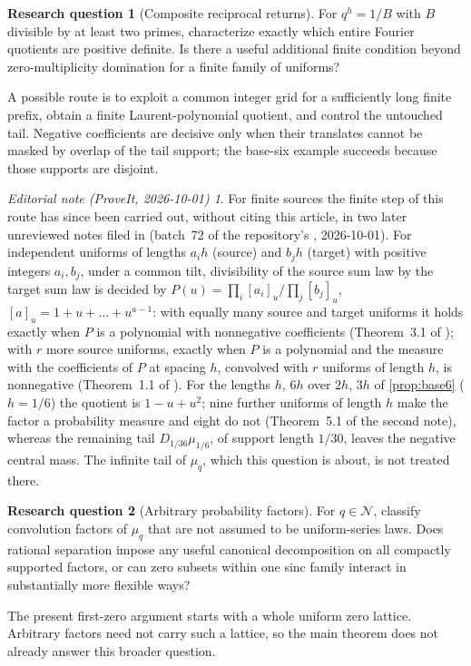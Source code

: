 \documentclass[11pt,letterpaper]{article}
\theoremstyle{definition}
\newtheorem{question}{Research question}
\theoremstyle{remark}
\newtheorem*{ednotelater}{Editorial note (ProveIt, 2026-10-01)}
\newcommand{\NR}{\mathcal N}
\numberwithin{equation}{section}
\begin{document}
\begin{question}[Composite reciprocal returns]
For $q^h=1/B$ with $B$ divisible by at least two primes, characterize exactly which entire Fourier quotients are positive definite. Is there a useful additional finite condition beyond zero-multiplicity domination for a finite family of uniforms?
\end{question}
A possible route is to exploit a common integer grid for a sufficiently long finite prefix, obtain a finite Laurent-polynomial quotient, and control the untouched tail. Negative coefficients are decisive only when their translates cannot be masked by overlap of the tail support; the base-six example succeeds because those supports are disjoint.
\begin{ednotelater}
For finite sources the finite step of this route has since been carried
out, without citing this article, in two later unreviewed notes filed in
 (batch~72 of the repository's , 2026-10-01). For
independent uniforms of lengths $a_ih$ (source) and $b_jh$ (target) with
positive integers $a_i,b_j$, under a common tilt, divisibility of the source
sum law by the target sum law is decided by
$P(u)=\prod_i[a_i]_u/\prod_j[b_j]_u$, $[a]_u=1+u+\dots+u^{a-1}$: with equally
many source and target uniforms it holds exactly when $P$ is a polynomial with
nonnegative coefficients (Theorem~3.1 of
); with $r$ more
source uniforms, exactly when $P$ is a polynomial and the measure with the
coefficients of $P$ at spacing $h$, convolved with $r$ uniforms of length $h$,
is nonnegative (Theorem~1.1 of
). For the
lengths $h$, $6h$ over $2h$, $3h$ of \cref{prop:base6} ($h=1/6$) the quotient
is $1-u+u^2$; nine further uniforms of length $h$ make the factor a
probability measure and eight do not (Theorem~5.1 of the second note), whereas
the remaining tail $D_{1/36}\mu_{1/6}$, of support length $1/30$, leaves the
negative central mass. The infinite tail of $\mu_q$, which this question is
about, is not treated there.
\end{ednotelater}

\begin{question}[Arbitrary probability factors]
For $q\in\NR$, classify convolution factors of $\mu_q$ that are not assumed to be uniform-series laws. Does rational separation impose any useful canonical decomposition on all compactly supported factors, or can zero subsets within one sinc family interact in substantially more flexible ways?
\end{question}
The present first-zero argument starts with a whole uniform zero lattice. Arbitrary factors need not carry such a lattice, so the main theorem does not already answer this broader question.
\end{document}
